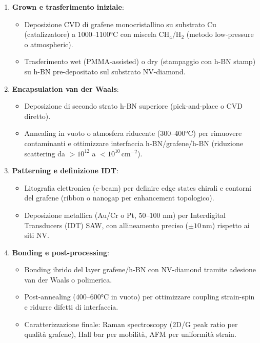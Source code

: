 \documentclass[12pt,a4paper]{article}
\begin{document}
\begin{enumerate}
    \item \textbf{Grown e trasferimento iniziale}: 
    \begin{itemize}
        \item Deposizione CVD di grafene monocristallino su substrato Cu (catalizzatore) a 1000--1100°C con miscela CH$_4$/H$_2$ (metodo low-pressure o atmospheric).
        \item Trasferimento wet (PMMA-assisted) o dry (stampaggio con h-BN stamp) su h-BN pre-depositato sul substrato NV-diamond.
    \end{itemize}
    
    \item \textbf{Encapsulation van der Waals}: 
    \begin{itemize}
        \item Deposizione di secondo strato h-BN superiore (pick-and-place o CVD diretto).
        \item Annealing in vuoto o atmosfera riducente (300--400°C) per rimuovere contaminanti e ottimizzare interfaccia h-BN/grafene/h-BN (riduzione scattering da $>10^{12}$ a $<10^{10}\,\mathrm{cm}^{-2}$).
    \end{itemize}
    
    \item \textbf{Patterning e definizione IDT}: 
    \begin{itemize}
        \item Litografia elettronica (e-beam) per definire edge states chirali e contorni del grafene (ribbon o nanogap per enhancement topologico).
        \item Deposizione metallica (Au/Cr o Pt, 50--100 nm) per Interdigital Transducers (IDT) SAW, con allineamento preciso ($\pm 10\,\mathrm{nm}$) rispetto ai siti NV.
    \end{itemize}
    
    \item \textbf{Bonding e post-processing}: 
    \begin{itemize}
        \item Bonding ibrido del layer grafene/h-BN con NV-diamond tramite adesione van der Waals o polimerica.
        \item Post-annealing (400--600°C in vuoto) per ottimizzare coupling strain-spin e ridurre difetti di interfaccia.
        \item Caratterizzazione finale: Raman spectroscopy (2D/G peak ratio per qualità grafene), Hall bar per mobilità, AFM per uniformità strain.
    \end{itemize}
\end{enumerate}
\end{document}
